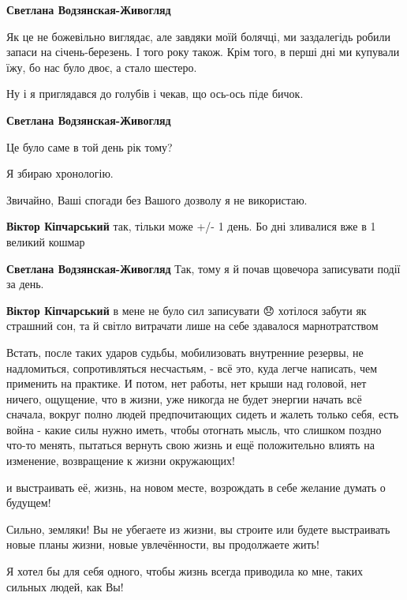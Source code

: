 \begin{itemize} %
\textbf{Светлана Водзянская-Живогляд} 

Як це не божевільно виглядає, але завдяки моїй болячці, ми заздалегідь робили
запаси на січень-березень. І того року також. Крім того, в перші дні ми
купували їжу, бо нас було двоє, а стало шестеро.

Ну і я приглядався до голубів і чекав, що ось-ось піде бичок.

\textbf{Светлана Водзянская-Живогляд} 

Це було саме в той день рік тому?

Я збираю хронологію.

Звичайно, Ваші спогади без Вашого дозволу я не використаю.

\textbf{Віктор Кіпчарський} так, тільки може +/- 1 день. Бо дні зливалися вже в 1 великий кошмар

\textbf{Светлана Водзянская-Живогляд} Так, тому я й почав щовечора записувати події за день.

\textbf{Віктор Кіпчарський} в мене не було сил записувати 😞 хотілося забути як страшний сон, та й світло витрачати лише на себе здавалося марнотратством
\end{itemize} %


Встать, после таких ударов судьбы, мобилизовать внутренние резервы, не
надломиться, сопротивляться несчастьям, - всё это, куда легче написать, чем
применить на практике. И потом, нет работы, нет крыши над головой, нет ничего,
ощущение, что в жизни, уже никогда не будет энергии начать всё сначала, вокруг
полно людей предпочитающих сидеть и жалеть только себя, есть война - какие силы
нужно иметь, чтобы отогнать мысль, что слишком поздно что-то менять, пытаться
вернуть свою жизнь и ещё положительно влиять на изменение, возвращение к жизни
окружающих!

и выстраивать её, жизнь, на новом месте, возрождать в себе желание думать о
будущем!

Сильно, земляки! Вы не убегаете из жизни, вы строите или будете выстраивать
новые планы жизни, новые увлечённости, вы продолжаете жить!

Я хотел бы для себя одного, чтобы жизнь всегда приводила ко мне, таких сильных
людей, как Вы!
